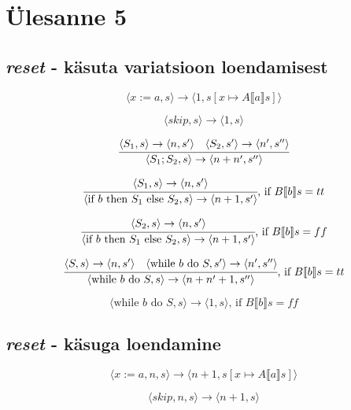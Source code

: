 \section{Ülesanne 5}

\subsection{\textit{reset} - käsuta variatsioon loendamisest}

\[
\langle x:=a,s \rangle \rightarrow
\langle 1, s[x \mapsto A \llbracket a \rrbracket s] \rangle
\]

\[
\langle skip,s \rangle \rightarrow
\langle 1, s \rangle
\]

\[
\cfrac{
  \langle S_1,s \rangle \rightarrow
  \langle n,s' \rangle
  \quad
  \langle S_2,s' \rangle \rightarrow
  \langle n',s'' \rangle
}{
  \langle S_1;S_2,s \rangle \rightarrow
  \langle n + n', s'' \rangle
}
\]

\[
\cfrac{
  \langle S_1,s \rangle \rightarrow
  \langle n,s' \rangle
}{
  \langle \text{if\ } b \text{\ then\ } S_1 \text{\ else\ } S_2,s \rangle
  \rightarrow
  \langle n + 1, s' \rangle
}\text{,\ if } B \llbracket b \rrbracket s = tt
\]

\[
\cfrac{
  \langle S_2,s \rangle \rightarrow
  \langle n,s' \rangle
}{
  \langle \text{if\ } b \text{\ then\ } S_1 \text{\ else\ } S_2,s \rangle
  \rightarrow
  \langle n + 1, s' \rangle
}\text{,\ if } B \llbracket b \rrbracket s = ff
\]

\[
\cfrac{
  \langle S,s \rangle \rightarrow
  \langle n,s' \rangle
  \quad
  \langle \text{while\ } b \text{\ do\ } S,s' \rangle
  \rightarrow
  \langle n', s'' \rangle
}{
  \langle \text{while\ } b \text{\ do\ } S,s \rangle
  \rightarrow
  \langle n + n' + 1, s'' \rangle
}\text{,\ if } B \llbracket b \rrbracket s = tt
\]

\[
\langle \text{while\ } b \text{\ do\ } S,s \rangle
\rightarrow
\langle 1, s \rangle
\text{,\ if } B \llbracket b \rrbracket s = ff
\]

\subsection{\textit{reset} - käsuga loendamine}

\[
\langle x:=a,n,s \rangle \rightarrow
\langle n + 1, s[x \mapsto A \llbracket a \rrbracket s] \rangle
\]

\[
\langle skip,n,s \rangle \rightarrow
\langle n + 1, s \rangle
\]

